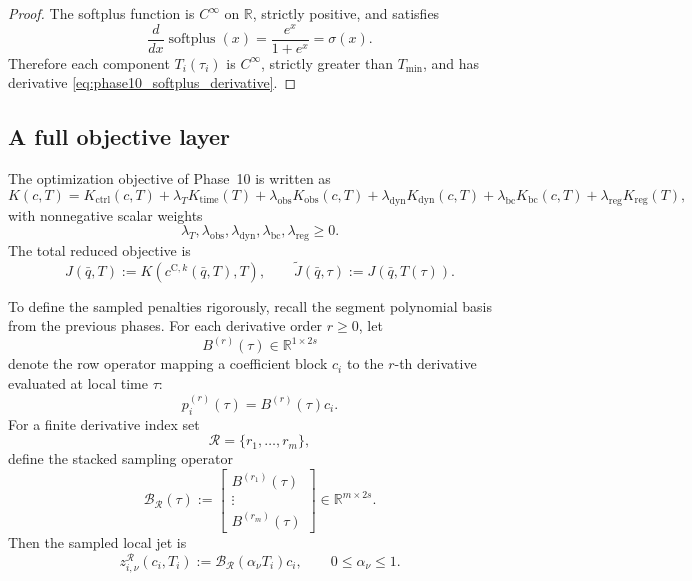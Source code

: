 \begin{proof}
The softplus function is \(C^\infty\) on \(\mathbb R\), strictly positive, and satisfies
\[
\frac{d}{dx}\operatorname{softplus}(x)=\frac{e^x}{1+e^x}=\sigma(x).
\]
Therefore each component \(T_i(\tau_i)\) is \(C^\infty\), strictly greater than \(T_{\min}\), and has derivative \eqref{eq:phase10_softplus_derivative}.
\end{proof}

\subsection{A full objective layer}
\label{subsec:phase10_full_objective}

The optimization objective of Phase~10 is written as
\begin{equation}
\label{eq:phase10_full_K}
K(c,T)
=
K_{\mathrm{ctrl}}(c,T)
+
\lambda_T K_{\mathrm{time}}(T)
+
\lambda_{\mathrm{obs}} K_{\mathrm{obs}}(c,T)
+
\lambda_{\mathrm{dyn}} K_{\mathrm{dyn}}(c,T)
+
\lambda_{\mathrm{bc}} K_{\mathrm{bc}}(c,T)
+
\lambda_{\mathrm{reg}} K_{\mathrm{reg}}(T),
\end{equation}
with nonnegative scalar weights
\[
\lambda_T,\lambda_{\mathrm{obs}},\lambda_{\mathrm{dyn}},\lambda_{\mathrm{bc}},\lambda_{\mathrm{reg}}\ge 0.
\]
The total reduced objective is
\begin{equation}
\label{eq:phase10_J}
J(\bar q,T):=K(c^{\mathrm{C},k}(\bar q,T),T),
\qquad
\widetilde J(\bar q,\tau):=J(\bar q,T(\tau)).
\end{equation}

To define the sampled penalties rigorously, recall the segment polynomial basis from the previous phases.
For each derivative order \(r\ge 0\), let
\[
B^{(r)}(\tau)\in\mathbb R^{1\times 2s}
\]
denote the row operator mapping a coefficient block \(c_i\) to the \(r\)-th derivative evaluated at local time \(\tau\):
\[
p_i^{(r)}(\tau)=B^{(r)}(\tau)c_i.
\]
For a finite derivative index set
\[
\mathcal R=\{r_1,\dots,r_m\},
\]
define the stacked sampling operator
\begin{equation}
\label{eq:phase10_stacked_B}
\mathcal B_{\mathcal R}(\tau)
:=
\begin{bmatrix}
B^{(r_1)}(\tau)\\
\vdots\\
B^{(r_m)}(\tau)
\end{bmatrix}
\in\mathbb R^{m\times 2s}.
\end{equation}
Then the sampled local jet is
\begin{equation}
\label{eq:phase10_sampled_jet}
z_{i,\nu}^{\mathcal R}(c_i,T_i)
:=
\mathcal B_{\mathcal R}(\alpha_\nu T_i)c_i,
\qquad
0\le \alpha_\nu\le 1.
\end{equation}

